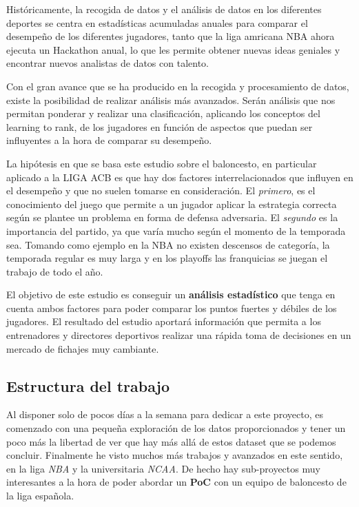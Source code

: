 \documentclass[]{article}
\begin{document}
Históricamente, la recogida de datos y el análisis de datos en los
diferentes deportes se centra en estadísticas acumuladas anuales para
comparar el desempeño de los diferentes jugadores, tanto que la liga
amricana NBA ahora ejecuta un Hackathon anual, lo que les permite
obtener nuevas ideas geniales y encontrar nuevos analistas de datos con
talento.

Con el gran avance que se ha producido en la recogida y procesamiento de
datos, existe la posibilidad de realizar análisis más avanzados. Serán
análisis que nos permitan ponderar y realizar una clasificación,
aplicando los conceptos del learning to rank, de los jugadores en
función de aspectos que puedan ser influyentes a la hora de comparar su
desempeño.

La hipótesis en que se basa este estudio sobre el baloncesto, en
particular aplicado a la LIGA ACB es que hay dos factores
interrelacionados que influyen en el desempeño y que no suelen tomarse
en consideración. El \emph{primero}, es el conocimiento del juego que
permite a un jugador aplicar la estrategia correcta según se plantee un
problema en forma de defensa adversaria. El \emph{segundo} es la
importancia del partido, ya que varía mucho según el momento de la
temporada sea. Tomando como ejemplo en la NBA no existen descensos de
categoría, la temporada regular es muy larga y en los playoffs las
franquicias se juegan el trabajo de todo el año.

El objetivo de este estudio es conseguir un \textbf{análisis
estadístico} que tenga en cuenta ambos factores para poder comparar los
puntos fuertes y débiles de los jugadores. El resultado del estudio
aportará información que permita a los entrenadores y directores
deportivos realizar una rápida toma de decisiones en un mercado de
fichajes muy cambiante.

\subsection{Estructura del trabajo}\label{estructura-del-trabajo}

Al disponer solo de pocos días a la semana para dedicar a este proyecto,
es comenzado con una pequeña exploración de los datos proporcionados y
tener un poco más la libertad de ver que hay más allá de estos dataset
que se podemos concluir. Finalmente he visto muchos más trabajos y
avanzados en este sentido, en la liga \emph{NBA} y la universitaria
\emph{NCAA}. De hecho hay sub-proyectos muy interesantes a la hora de
poder abordar un \textbf{PoC} con un equipo de baloncesto de la liga
española.
\end{document}

